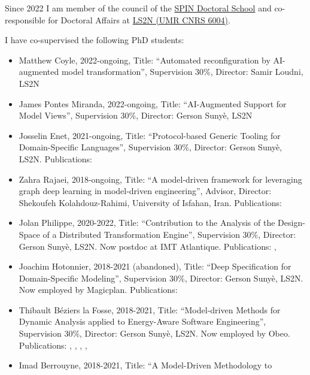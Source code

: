 Since 2022 I am member of the council of the
\href{https://ed-spin.doctorat-bretagne.fr/}{SPIN Doctoral School} and
co-responsible for Doctoral Affairs at \href{http://www.ls2n.fr/}{LS2N
(UMR CNRS 6004)}.

I have co-supervised the following PhD students:

\begin{itemize}
\item
  Matthew Coyle, 2022-ongoing, Title: ``Automated reconfiguration by
  AI-augmented model transformation'', Supervision 30\%, Director: Samir
  Loudni, LS2N
\item
  James Pontes Miranda, 2022-ongoing, Title: ``AI-Augmented Support for
  Model Views'', Supervision 30\%, Director: Gerson Sunyè, LS2N
\item
  Josselin Enet, 2021-ongoing, Title: ``Protocol-based Generic Tooling
  for Domain-Specific Languages'', Supervision 30\%, Director: Gerson
  Sunyè, LS2N. Publications: \cite{enetProtocolBasedInteractiveDebugging2023}
\item
  Zahra Rajaei, 2018-ongoing, Title: ``A model-driven framework for
  leveraging graph deep learning in model-driven engineering'', Advisor,
  Director: Shekoufeh Kolahdouz-Rahimi, University of Isfahan, Iran. Publications: \cite{rajaeiDSLEncodingModels2021}
\item
  Jolan Philippe, 2020-2022, Title: ``Contribution to the Analysis of
  the Design-Space of a Distributed Transformation Engine'', Supervision
  30\%, Director: Gerson Sunyè, LS2N. Now postdoc at IMT Atlantique. Publications: \cite{philippeExecutingCertifiedModel2021}, \cite{philippeTransparentCombinationModel2020}
\item
  Joachim Hotonnier, 2018-2021 (abandoned), Title: ``Deep Specification
  for Domain-Specific Modeling'', Supervision 30\%, Director: Gerson
  Sunyè, LS2N. Now employed by Magicplan. Publications: \cite{chengCertifyingRulebasedModel2020} 
\item
  Thibault Béziers la Fosse, 2018-2021, Title: ``Model-driven Methods
  for Dynamic Analysis applied to Energy-Aware Software Engineering'',
  Supervision 30\%, Director: Gerson Sunyè, LS2N. Now employed by Obeo. Publications: \cite{bezierslafosseCharacterizingSourceCode2018}, \cite{bezierslafosseInjectingExecutionTraces2018}, \cite{bezierslafosseSourceCodeLevelRegression2019}, \cite{bezierslafossePlatformSpecificEnergy2019}, \cite{bezierslafosseAnnotatingExecutableDSLs2020}
\item
  Imad Berrouyne, 2018-2021, Title: ``A Model-Driven Methodology to

\end{itemize}

